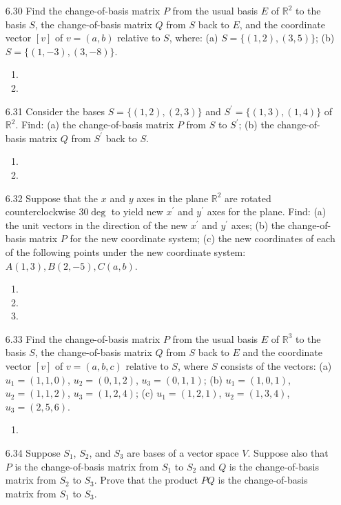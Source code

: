 \documentclass[12pt]{article}
\begin{document}
\begin{enumerate}
\item[6.30] Find the change-of-basis matrix $P$ from the usual basis $E$ of $\mathbb{R}^2$ to the basis $S$, the change-of-basis matrix $Q$ from $S$ back to $E$, and the coordinate vector $[v]$ of $v=(a,b)$ relative to $S$, where: (a) $S=\{(1,2),(3,5)\}$; (b) $S=\{(1,-3),(3,-8)\}$.
	\begin{enumerate}
	\item
	\item
	\end{enumerate}
\item[6.31] Consider the bases $S=\{(1,2),(2,3)\}$ and $S^\prime=\{(1,3),(1,4)\}$ of $\mathbb{R}^2$. Find: (a) the change-of-basis matrix $P$ from $S$ to $S^\prime$; (b) the change-of-basis matrix $Q$ from $S^\prime$ back to $S$.
	\begin{enumerate}
	\item
	\item
	\end{enumerate}
\item[6.32] Suppose that the $x$ and $y$ axes in the plane $\mathbb{R}^2$ are rotated counterclockwise $30\deg$ to yield new $x^\prime$ and $y^\prime$ axes for the plane. Find: (a) the unit vectors in the direction of the new $x^\prime$ and $y^\prime$ axes; (b) the change-of-basis matrix $P$ for the new coordinate system; (c) the new coordinates of each of the following points under the new coordinate system: $A(1,3), B(2,-5), C(a,b)$.
	\begin{enumerate}
	\item
	\item
	\item
	\end{enumerate}
\item[6.33] Find the change-of-basis matrix $P$ from the usual basis $E$ of $\mathbb{R}^3$ to the basis $S$, the change-of-basis matrix $Q$ from $S$ back to $E$ and the coordinate vector $[v]$ of $v=(a,b,c)$ relative to $S$, where $S$ consists of the vectors: (a) $u_1=(1,1,0)$, $u_2=(0,1,2)$, $u_3=(0,1,1)$; (b) $u_1=(1,0,1)$, $u_2=(1,1,2)$, $u_3=(1,2,4)$; (c) $u_1=(1,2,1)$, $u_2=(1,3,4)$, $u_3=(2,5,6)$.
	\begin{enumerate}
	\item
	\end{enumerate}
\item[6.34] Suppose $S_1$, $S_2$, and $S_3$ are bases of a vector space $V$. Suppose also that $P$ is the change-of-basis matrix from $S_1$ to $S_2$ and $Q$ is the change-of-basis matrix from $S_2$ to $S_3$. Prove that the product $PQ$ is the change-of-basis matrix from $S_1$ to $S_3$.

\end{enumerate}
\end{document}
